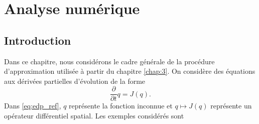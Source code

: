 \chapter{Analyse numérique}
\label{chap:2}

\section{Introduction}

Dans ce chapitre, nous considérons le cadre générale de la procédure d'approximation utilisée à partir du chapitre \ref{chap:3}. On considère des équations aux dérivées partielles d'évolution de la forme
\begin{equation}
\dfrac{\partial}{\partial t}q = J(q).
\label{eq:edp_ref}
\end{equation}
Dans \eqref{eq:edp_ref}, $q$ représente la fonction inconnue et $q \mapsto J(q)$ représente un opérateur différentiel spatial. Les exemples considérés sont
